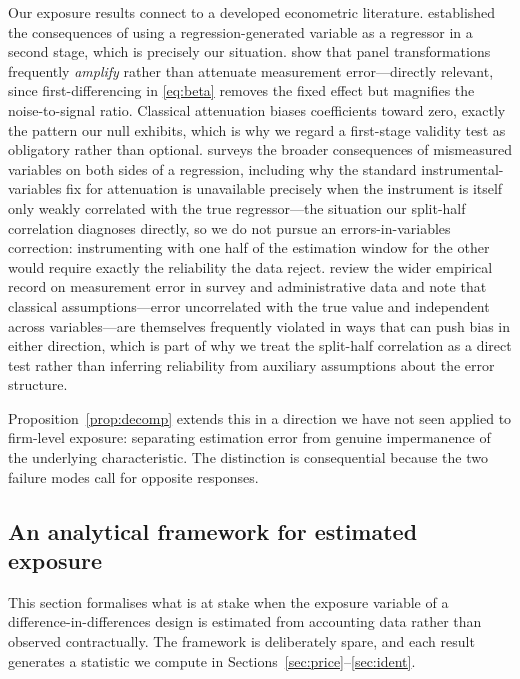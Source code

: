 \documentclass[review,12pt,authoryear]{elsarticle}
\theoremstyle{plain}
\theoremstyle{definition}
\begin{document}
Our exposure results connect to a developed econometric literature.
\citet{pagan1984} established the consequences of using a regression-generated
variable as a regressor in a second stage, which is precisely our situation.
\citet{griliches1986} show that panel transformations frequently \emph{amplify}
rather than attenuate measurement error---directly relevant, since
first-differencing in \eqref{eq:beta} removes the fixed effect but magnifies the
noise-to-signal ratio. Classical attenuation biases coefficients toward zero,
exactly the pattern our null exhibits, which is why we regard a first-stage
validity test as obligatory rather than optional. \citet{hausman2001} surveys
the broader consequences of mismeasured variables on both sides of a
regression, including why the standard instrumental-variables fix for
attenuation is unavailable precisely when the instrument is itself only weakly
correlated with the true regressor---the situation our split-half correlation
diagnoses directly, so we do not pursue an errors-in-variables correction:
instrumenting with one half of the estimation window for the other would
require exactly the reliability the data reject. \citet{boundbrownmathiowetz2001}
review the wider empirical record on measurement error in survey and
administrative data and note that classical assumptions---error uncorrelated
with the true value and independent across variables---are themselves
frequently violated in ways that can push bias in either direction, which is
part of why we treat the split-half correlation as a direct test rather than
inferring reliability from auxiliary assumptions about the error structure.

Proposition~\ref{prop:decomp} extends this in a direction we have not seen
applied to firm-level exposure: separating estimation error from genuine
impermanence of the underlying characteristic. The distinction is consequential
because the two failure modes call for opposite responses.

\subsection{An analytical framework for estimated exposure}
\label{sec:framework}


This section formalises what is at stake when the exposure variable of a
difference-in-differences design is estimated from accounting data rather than
observed contractually. The framework is deliberately spare, and each result
generates a statistic we compute in Sections~\ref{sec:price}--\ref{sec:ident}.
\end{document}
